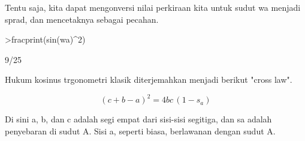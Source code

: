 \documentclass[a4paper,10pt]{article}
\begin{document}
\begin{eulernotebook}
\begin{eulercomment}
\begin{eulercomment}
\begin{eulercomment}
\begin{eulercomment}
\begin{eulercomment}
\begin{eulercomment}
\begin{eulercomment}
\begin{eulercomment}
\begin{eulercomment}
\begin{eulercomment}
\begin{eulercomment}
\begin{eulercomment}
\begin{eulercomment}
\begin{eulercomment}
\begin{eulercomment}
\begin{eulercomment}
\begin{eulercomment}
\begin{eulercomment}
\begin{eulercomment}
\begin{eulercomment}
\begin{eulercomment}
\begin{eulercomment}
\begin{eulercomment}
\begin{eulercomment}
\begin{eulercomment}
\begin{eulercomment}
\begin{eulercomment}
\begin{eulercomment}
\begin{eulercomment}
\begin{eulercomment}
\begin{eulercomment}
\begin{eulercomment}
\begin{eulercomment}
\begin{eulercomment}
\begin{eulercomment}
\begin{eulercomment}
\begin{eulercomment}
\begin{eulercomment}
\begin{eulercomment}
\begin{eulercomment}
\begin{eulercomment}
Tentu saja, kita dapat mengonversi nilai perkiraan kita untuk sudut wa
menjadi sprad, dan mencetaknya sebagai pecahan.
\end{eulercomment}
\begin{eulerprompt}
>fracprint(sin(wa)^2)
\end{eulerprompt}
\begin{euleroutput}
  9/25
\end{euleroutput}
\begin{eulercomment}
Hukum kosinus trgonometri klasik diterjemahkan menjadi berikut "cross
law".

\end{eulercomment}
\begin{eulerformula}
\[
(c+b-a)^2 = 4 b c \, (1-s_a)
\]
\end{eulerformula}
\begin{eulercomment}
Di sini a, b, dan c adalah segi empat dari sisi-sisi segitiga, dan sa
adalah penyebaran di sudut A. Sisi a, seperti biasa, berlawanan dengan
sudut A.


\end{eulercomment}
\end{eulercomment}
\end{eulercomment}
\end{eulercomment}
\end{eulercomment}
\end{eulercomment}
\end{eulercomment}
\end{eulercomment}
\end{eulercomment}
\end{eulercomment}
\end{eulercomment}
\end{eulercomment}
\end{eulercomment}
\end{eulercomment}
\end{eulercomment}
\end{eulercomment}
\end{eulercomment}
\end{eulercomment}
\end{eulercomment}
\end{eulercomment}
\end{eulercomment}
\end{eulercomment}
\end{eulercomment}
\end{eulercomment}
\end{eulercomment}
\end{eulercomment}
\end{eulercomment}
\end{eulercomment}
\end{eulercomment}
\end{eulercomment}
\end{eulercomment}
\end{eulercomment}
\end{eulercomment}
\end{eulercomment}
\end{eulercomment}
\end{eulercomment}
\end{eulercomment}
\end{eulercomment}
\end{eulercomment}
\end{eulercomment}
\end{eulercomment}
\end{eulernotebook}
\end{document}
